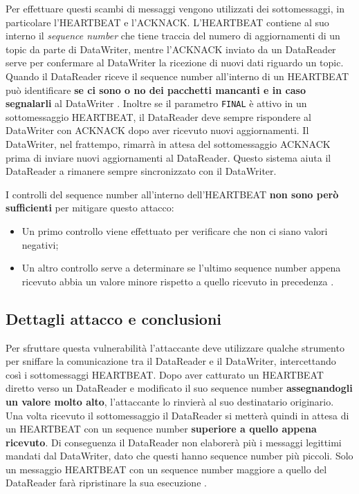 Per effettuare questi scambi di messaggi vengono utilizzati dei sottomessaggi,
in particolare l'HEARTBEAT e l'ACKNACK.
L'HEARTBEAT contiene al suo interno il \textit{sequence number} che tiene traccia 
del numero di aggiornamenti di un topic da parte di DataWriter, mentre
l'ACKNACK inviato da un DataReader
serve per confermare al DataWriter la ricezione di nuovi dati 
riguardo un topic.
Quando il DataReader riceve il sequence number all'interno di un HEARTBEAT
può identificare 
\textbf{se ci sono o no dei pacchetti mancanti e in caso segnalarli} al
DataWriter \cite{White2017AnII}.
Inoltre se il parametro \texttt{FINAL} è attivo in un sottomessaggio HEARTBEAT, il DataReader 
deve sempre rispondere al DataWriter con ACKNACK dopo aver ricevuto nuovi aggiornamenti.
Il DataWriter, nel frattempo, rimarrà in attesa del sottomessaggio 
ACKNACK prima di 
inviare nuovi aggiornamenti al DataReader.
Questo sistema aiuta il DataReader a rimanere sempre sincronizzato con il 
DataWriter.

I controlli del sequence number all'interno dell'HEARTBEAT 
\textbf{non sono però sufficienti} per mitigare questo attacco:
\begin{itemize}
    \item Un primo controllo viene effettuato per verificare che non ci siano 
    valori negativi;
    \item Un altro controllo serve a determinare se l'ultimo sequence number
    appena ricevuto abbia
    un valore minore rispetto a quello ricevuto in precedenza
    \cite{White2017AnII}.
\end{itemize}


\subsection{Dettagli attacco e conclusioni}

Per sfruttare questa vulnerabilità l'attaccante deve utilizzare qualche 
strumento per sniffare la comunicazione tra il DataReader e il DataWriter,
intercettando così i
sottomessaggi HEARTBEAT. Dopo aver catturato un HEARTBEAT diretto verso 
un DataReader e modificato 
il suo sequence number \textbf{assegnandogli un valore molto alto}, 
l'attaccante lo rinvierà al suo destinatario originario.
Una volta ricevuto il sottomessaggio il DataReader si metterà quindi 
in attesa di un HEARTBEAT con un sequence number 
\textbf{superiore a quello appena ricevuto}. Di conseguenza il DataReader
non elaborerà più i messaggi legittimi mandati dal DataWriter,
dato che questi hanno sequence number più piccoli.
Solo un messaggio HEARTBEAT con un sequence number
maggiore a quello del DataReader farà ripristinare la sua esecuzione 
\cite{White2017AnII}.


